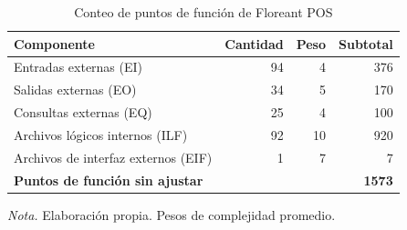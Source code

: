 \begin{table}[H]
\caption{Conteo de puntos de función de Floreant POS}
\label{tab:ref2_pf}
\begin{threeparttable}
\begin{tabular}{>{\raggedright\arraybackslash}p{6cm} rrr}
\toprule
Componente & Cantidad & Peso & Subtotal \\
\midrule
Entradas externas (EI) & 94 & 4 & 376 \\
Salidas externas (EO) & 34 & 5 & 170 \\
Consultas externas (EQ) & 25 & 4 & 100 \\
Archivos lógicos internos (ILF) & 92 & 10 & 920 \\
Archivos de interfaz externos (EIF) & 1 & 7 & 7 \\
\textbf{Puntos de función sin ajustar} &  &  & \textbf{1573} \\
\bottomrule
\end{tabular}
\begin{tablenotes}
\item \textit{Nota.} Elaboración propia. Pesos de complejidad promedio.
\end{tablenotes}
\end{threeparttable}
\end{table}

